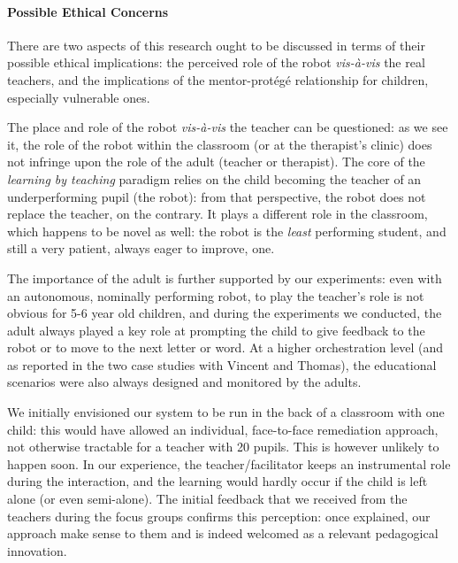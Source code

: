 \documentclass{article}
\begin{document}
\paragraph{Possible Ethical Concerns} There are two aspects of this research ought to be
discussed in terms of their possible ethical implications: the perceived role of
the robot \textit{vis-à-vis} the real teachers, and the implications of the
mentor-protégé relationship for children, especially vulnerable ones.

The place and role of the robot \textit{vis-à-vis} the teacher can be
questioned: as we see it, the role of the robot within the classroom (or at the
therapist's clinic) does not infringe upon the role of the adult (teacher or
therapist). The core of the \emph{learning by teaching} paradigm relies on the
child becoming the teacher of an underperforming pupil (the robot): from that
perspective, the robot does not replace the teacher, on the contrary. It plays a
different role in the classroom, which happens to be novel as well: the robot is
the \emph{least} performing student, and still a very patient, always eager to
improve, one.

The importance of the adult is further supported by our experiments: even with
an autonomous, nominally performing robot, to play the teacher's role is
not obvious for 5-6 year old children, and during the experiments we conducted,
the adult always played a key role at prompting the child to give feedback to
the robot or to move to the next letter or word.  At a higher orchestration
level (and as reported in the two case studies with Vincent and Thomas), the
educational scenarios were also always designed and monitored by the adults.

We initially envisioned our system to be run in the back of a classroom with one
child: this would have allowed an individual, face-to-face remediation approach,
not otherwise tractable for a teacher with 20 pupils.  This is however unlikely
to happen soon. In our experience, the teacher/facilitator keeps an instrumental
role during the interaction, and the learning would hardly occur if the child is
left alone (or even semi-alone). The initial feedback that we received from the
teachers during the focus groups confirms this perception: once explained, our
approach make sense to them and is indeed welcomed as a relevant pedagogical
innovation.
\end{document}
